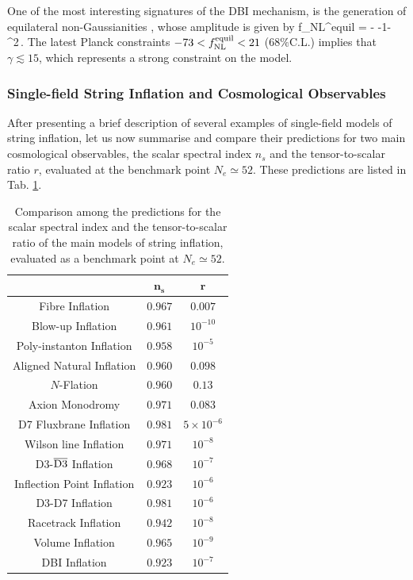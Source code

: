 One of the most interesting signatures of the DBI  mechanism, is the generation of equilateral non-Gaussianities  \cite{Alishahiha:2004eh}, whose amplitude is given by 
\be\label{fnlequil}
f_{\rm NL}^{\rm equil} = -\lp{} -1\rp\simeq-\,\gamma^2\,.
\ee
The latest Planck constraints  $-73<f_{\rm NL}^{\rm equil}<21$ ($68\%$C.L.) \cite{Planck:2019kim} implies that $\gamma\lesssim 15$, which represents a strong constraint on the model. 

\subsubsection{Single-field String Inflation and Cosmological Observables}

After presenting a brief description of several examples of single-field models of string inflation, let us now summarise and compare their predictions for two main cosmological observables, the scalar spectral index $n_s$ and the tensor-to-scalar ratio $r$, evaluated at the benchmark point $N_e\simeq 52$. These predictions are listed in Tab. \ref{TabPredInfl}. 

\begin{table}[ht]
\centering 
\begin{tabular}{|c|c|c|} 
\hline
\cellcolor[gray]{0.9}{\bf String model} & \cellcolor[gray]{0.9} $\boldsymbol{n_s}$ & \cellcolor[gray]{0.9}$\boldsymbol{r}$  \\ 
\hline 
\hline
Fibre Inflation & $0.967$ & $0.007$  \\ 
\hline
Blow-up Inflation & $0.961$ & $10^{-10}$  \\
\hline
Poly-instanton Inflation & $0.958$ & $10^{-5}$  \\
\hline
Aligned Natural Inflation & $0.960$ & $0.098$  \\
\hline
$N$-Flation & $0.960$ & $0.13$ \\
\hline
Axion Monodromy & $0.971$ & $0.083$  \\  
\hline 
D7 Fluxbrane Inflation & $0.981$ & $5\times 10^{-6}$ \\
\hline
Wilson line Inflation & $0.971$ & $10^{-8}$  \\
\hline
D3-$\overline{\rm D3}$ Inflation & $0.968$ & $10^{-7}$  \\
\hline
Inflection Point Inflation & $0.923$ & $10^{-6}$  \\
\hline
D3-D7 Inflation & $0.981$ & $10^{-6}$  \\
\hline
Racetrack Inflation & $0.942$ & $10^{-8}$  \\  
\hline 
Volume Inflation & $0.965$ & $10^{-9}$  \\ 
\hline
DBI Inflation & $0.923$ & $10^{-7}$  \\
\hline 
\end{tabular}
\caption{Comparison among the predictions for the scalar spectral index and the tensor-to-scalar ratio of the main models of string inflation, evaluated as a benchmark point at $N_e\simeq 52$.}
\label{TabPredInfl}
\end{table}


